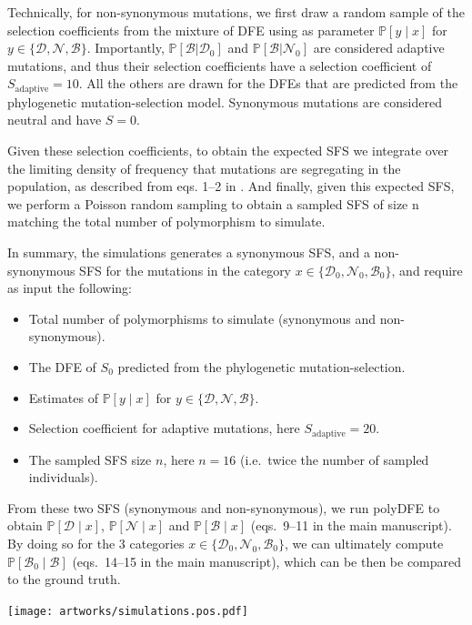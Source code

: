\documentclass{article}
\newcommand{\proba}{\mathbb{P}}
\newcommand{\Sphy}{S_{0}}
\newcommand{\SphyDel}{\mathcal{D}_0}
\newcommand{\SphyNeu}{\mathcal{N}_0}
\newcommand{\SphyBen}{\mathcal{B}_0}
\newcommand{\given}{\mid}
\newcommand{\SpopDel}{\mathcal{D}}
\newcommand{\SpopNeu}{\mathcal{N}}
\newcommand{\SpopBen}{\mathcal{B}}
\begin{document}
    Technically, for non-synonymous mutations, we first draw a random sample of the selection coefficients from the mixture of DFE using as parameter $\proba [y \given x]$ for $y \in \{ \SpopDel, \SpopNeu, \SpopBen \}$.
    Importantly, $\proba [\SpopBen | \SphyDel]$ and $\proba [\SpopBen | \SphyNeu]$ are considered adaptive mutations, and thus their selection coefficients have a selection coefficient of $S_{\text{adaptive}}=10$.
    All the others are drawn for the DFEs that are predicted from the phylogenetic mutation-selection model.
    Synonymous mutations are considered neutral and have $S=0$.

    Given these selection coefficients, to obtain the expected SFS we integrate over the limiting density of frequency that mutations are segregating in the population, as described from eqs. 1--2 in \textcite{tataru_inference_2017}.
    And finally, given this expected SFS, we perform a Poisson random sampling to obtain a sampled SFS of size n matching the total number of polymorphism to simulate.

    In summary, the simulations generates a synonymous SFS, and a non-synonymous SFS for the mutations in the category $x \in \{ \SphyDel, \SphyNeu, \SphyBen \}$, and require as input the following:
    \begin{itemize}
        \item Total number of polymorphisms to simulate (synonymous and non-synonymous).
        \item The DFE of $\Sphy$ predicted from the phylogenetic mutation-selection.
        \item Estimates of $\proba [y \given x]$ for $y \in \{ \SpopDel, \SpopNeu, \SpopBen \}$.
        \item Selection coefficient for adaptive mutations, here $S_{\text{adaptive}}=20$.
        \item The sampled SFS size $n$, here $n=16$ (i.e.\ twice the number of sampled individuals).
    \end{itemize}

    From these two SFS (synonymous and non-synonymous), we run polyDFE to obtain $\proba [\SpopDel \given x]$, $\proba [\SpopNeu \given x]$ and $\proba [\SpopBen \given x]$ (eqs.\ 9--11 in the main manuscript).
    By doing so for the 3 categories $x \in \{ \SphyDel, \SphyNeu, \SphyBen \}$, we can ultimately compute $\proba [\SphyBen \given \SpopBen]$ (eqs.\ 14--15 in the main manuscript), which can be then be compared to the ground truth.

    \newpage
    \begin{center}
        \texttt{[image: artworks/simulations.pos.pdf]}
    \end{center}
\end{document}
